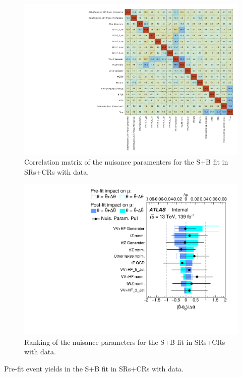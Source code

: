 \begin{figure}[htbp]
	\centering
	\includegraphics[width=.95\textwidth]{Chapters/CH8/figures/SPLUSB_CRSR_DL1rc_unblind/CorrMatrix}
	\caption{Correlation matrix of the nuisance paramenters for the S+B \tZc fit in SRs+CRs with data.}%
	\label{fig:stat:tzc:splusb:crsr:corrmatrix_unb}
\end{figure}

\begin{figure}[htbp]
	\centering
	\includegraphics[width=.9\textwidth]{Chapters/CH8/figures/SPLUSB_CRSR_DL1rc_unblind/Ranking}
	\caption{Ranking of the nuisance parameters for the S+B \tZc fit in SRs+CRs with data.}%
	\label{fig:stat:tzc:splusb:crsr:ranking_unb}
\end{figure}

\FloatBarrier
\clearpage
\begin{table}[]
	\centering
	\tiny
	
	\caption{Pre-fit event yields in the S+B \tZc fit in SRs+CRs with data. \TabErrStatSys} 
	\label{tab:stat:tzc:splusb:crsr:yields:prefit_unb}
\end{table} 

